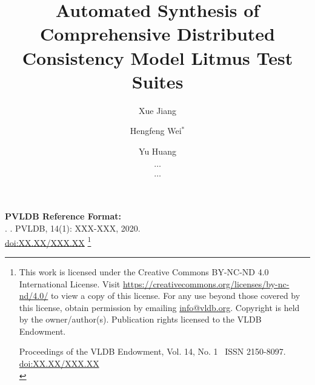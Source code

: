 \documentclass[sigconf, nonacm]{acmart}
\newcommand\vldbdoi{XX.XX/XXX.XX}
\newcommand\vldbpages{XXX-XXX}
\newcommand\vldbvolume{14}
\newcommand\vldbissue{1}
\newcommand\vldbyear{2020}
\newcommand\vldbauthors{\authors}
\newcommand\vldbtitle{\shorttitle}
\newcommand\vldbpagestyle{plain}
\begin{document}
\title{Automated Synthesis of Comprehensive Distributed Consistency Model Litmus Test Suites}

\author{Xue Jiang}

\author{Hengfeng Wei$^*$}

\author{Yu Huang}

\author{$\dots$}
\affiliation{%
  \institution{}
}
\email{}

\author{$\dots$}
\affiliation{%
  \institution{}
}
\email{}



\maketitle

\pagestyle{\vldbpagestyle}
\begingroup\small\noindent\raggedright\textbf{PVLDB Reference Format:}\\
\vldbauthors. \vldbtitle. PVLDB, \vldbvolume(\vldbissue): \vldbpages, \vldbyear.\\
\href{https://doi.org/\vldbdoi}{doi:\vldbdoi}
\endgroup
\begingroup
\renewcommand\thefootnote{}\footnote{\noindent
This work is licensed under the Creative Commons BY-NC-ND 4.0 International License. Visit \url{https://creativecommons.org/licenses/by-nc-nd/4.0/} to view a copy of this license. For any use beyond those covered by this license, obtain permission by emailing \href{mailto:info@vldb.org}{info@vldb.org}. Copyright is held by the owner/author(s). Publication rights licensed to the VLDB Endowment. \\
\raggedright Proceedings of the VLDB Endowment, Vol. \vldbvolume, No. \vldbissue\ %
ISSN 2150-8097. \\
\href{https://doi.org/\vldbdoi}{doi:\vldbdoi} \\
}\addtocounter{footnote}{-1}\endgroup
\end{document}
